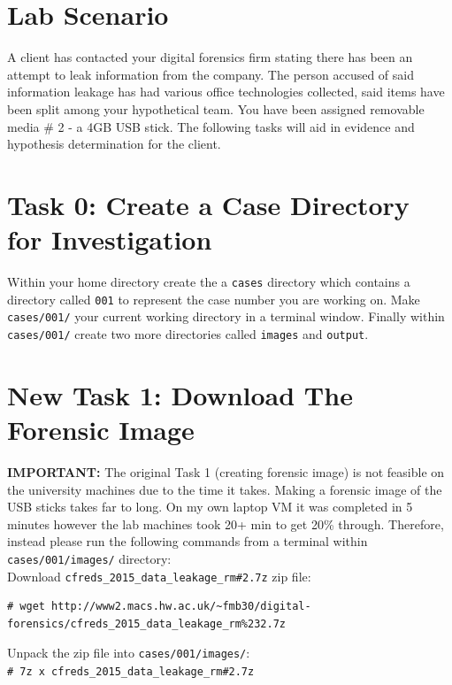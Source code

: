\documentclass[a4paper,11pt]{article}
\begin{document}
\section{Lab Scenario}
A client has contacted your digital forensics firm stating there has been an attempt to leak information from the company. The person accused of said information leakage has had various office technologies collected, said items have been split among your hypothetical team. You have been assigned removable media {\#} 2 - a 4GB USB stick. The following tasks will aid in evidence and hypothesis determination for the client.

\section{Task 0: Create a Case Directory for Investigation}
Within your home directory create the a \texttt{cases} directory which contains a directory called \texttt{001} to represent the case number you are working on. Make \texttt{cases/001/} your current working directory in a terminal window. Finally within \texttt{cases/001/} create two more directories called \texttt{images} and \texttt{output}.

\section{New Task 1: Download The Forensic Image}\label{sec:task1-forensic-image}

\textbf{IMPORTANT:} The original Task 1 (creating forensic image) is not feasible on the university machines due to the time it takes. Making a forensic image of the USB sticks takes far to long. On my own laptop VM it was completed in 5 minutes however the lab machines took 20+ min to get 20{\%} through. Therefore, instead please run the following commands from a terminal within \texttt{cases/001/images/} directory:\\

\noindent
Download \texttt{cfreds\_2015\_data\_leakage\_rm{\#}2.7z} zip file:
\begin{lstlisting}[breaklines]
# wget http://www2.macs.hw.ac.uk/~fmb30/digital-forensics/cfreds_2015_data_leakage_rm%232.7z

\end{lstlisting}

\noindent
Unpack the zip file into \texttt{cases/001/images/}:\\
\verb|# 7z x cfreds_2015_data_leakage_rm#2.7z| \\
\end{document}
